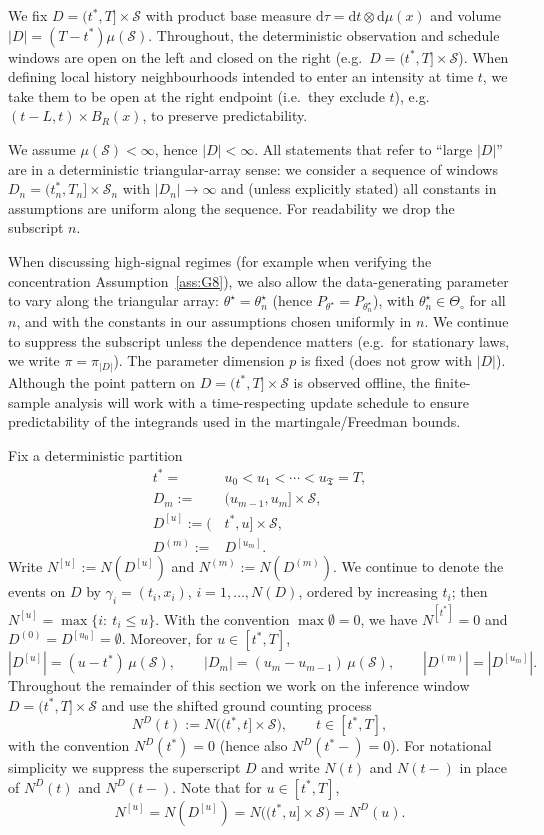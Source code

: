 \documentclass{statsoc}
\newcommand{\dd}{\mathrm{d}}
\newcommand{\1}{\mathbbm{1}}
\newcommand{\Tmax}{\mathfrak{T}}
\begin{document}
We fix $D=(t^\ast,T]\times\mathcal S$ with product base measure $\dd\tau=\dd t\otimes\dd\mu(x)$ and volume
$|D|=(T-t^\ast) \mu(\mathcal S)$.  Throughout, the deterministic observation and schedule windows are open on the left and closed on the right (e.g.\ $D=(t^\ast,T]\times\mathcal S$). When defining local history neighbourhoods intended to enter an intensity at time \(t\), we take them to be open at the right endpoint (i.e.\ they exclude \(t\)), e.g.\ \((t-L,t)\times B_R(x)\), to preserve predictability.

We assume $\mu(\mathcal S)<\infty$, hence $|D|<\infty$.  All statements that refer to ``large $|D|$'' are in a deterministic triangular-array sense: we consider a sequence of windows $D_n=(t^\ast_n,T_n]\times\mathcal S_n$ with $|D_n|\to\infty$ and (unless explicitly stated) all constants in assumptions are uniform along the sequence. For readability we drop the subscript $n$. 

When discussing high-signal regimes (for example when verifying the concentration Assumption~\ref{ass:G8}), we also allow the data-generating parameter to vary along the triangular array:
$\theta^\star=\theta^\star_n$ (hence $P_{\theta^\star}=P_{\theta^\star_n}$), with $\theta^\star_n\in\Theta_\circ$ for all $n$, and with the constants in our assumptions chosen uniformly in $n$. We continue to suppress the subscript unless the dependence matters (e.g.\ for stationary laws, we write $\pi=\pi_{|D|}$). The parameter dimension $p$ is fixed (does not grow with $|D|$). Although the point pattern on $D=(t^\ast,T]\times\mathcal S$ is observed offline, the finite-sample analysis will work with a time-respecting update schedule to ensure predictability of the integrands used in the martingale/Freedman bounds.

Fix a deterministic partition
\begin{align*}
t^\ast=&u_0<u_1<\cdots<u_{\Tmax}=T,\\
D_m:=&(u_{m-1},u_m]\times\mathcal S,\\
D^{[u]}:=(&t^\ast,u]\times\mathcal S,\\
D^{(m)}:=&D^{[u_m]}.
\end{align*}
Write $N^{[u]}:=N(D^{[u]})$ and $N^{(m)}:=N(D^{(m)})$.
We continue to denote the events on $D$ by $\gamma_i=(t_i,x_i)$,
$i=1,\dots,N(D)$, ordered by increasing $t_i$; then $N^{[u]}=\max\{i:\ t_i\le u\}$. With the convention $\max\emptyset=0$, we have $N^{[t^\ast]}=0$ and $D^{(0)}=D^{[u_0]}=\emptyset$.
Moreover, for $u\in[t^\ast,T]$,
\[
|D^{[u]}|=(u-t^\ast)\,\mu(\mathcal S),
\qquad
|D_m|=(u_m-u_{m-1})\,\mu(\mathcal S),
\qquad
|D^{(m)}|=|D^{[u_m]}|.
\]
Throughout the remainder of this section we work on the inference window $D=(t^\ast,T]\times\mathcal S$ and use the shifted ground counting process
\[
N^D(t):=N\big((t^\ast,t]\times\mathcal S\big),\qquad t\in[t^\ast,T],
\]
with the convention $N^D(t^\ast)=0$ (hence also $N^D(t^\ast-)=0$). For notational simplicity we suppress the superscript $D$ and write $N(t)$ and $N(t-)$ in place of $N^D(t)$ and $N^D(t-)$. Note that for $u\in[t^\ast,T]$,
\[
N^{[u]}=N(D^{[u]})=N\big((t^\ast,u]\times\mathcal S\big)=N^D(u).
\]
\end{document}
